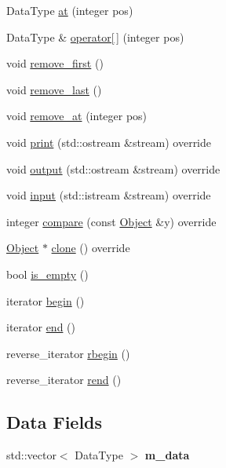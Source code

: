 \begin{DoxyCompactItemize}
\item 
Data\+Type \hyperlink{classez_1_1objects_1_1Vector_a167a5c74341831e735f10bb731fb2e6f}{at} (integer pos)
\item 
Data\+Type \& \hyperlink{classez_1_1objects_1_1Vector_aee5011651f4f13353fd0b8906467b6e3}{operator\mbox{[}$\,$\mbox{]}} (integer pos)
\item 
void \hyperlink{classez_1_1objects_1_1Vector_a6758995f2b561c6e078368fa85a8e552}{remove\+\_\+first} ()
\item 
void \hyperlink{classez_1_1objects_1_1Vector_a76e84ee9ab9024011adb4ac57571c27a}{remove\+\_\+last} ()
\item 
void \hyperlink{classez_1_1objects_1_1Vector_ad0c0f45ce57d1c99650d0a7bf0b9c2bd}{remove\+\_\+at} (integer pos)
\item 
void \hyperlink{classez_1_1objects_1_1Vector_a1c548586b93d57a8fa99e38167442f37}{print} (std\+::ostream \&stream) override
\item 
void \hyperlink{classez_1_1objects_1_1Vector_a934bda76e5686f1af4a45dda39d75744}{output} (std\+::ostream \&stream) override
\item 
void \hyperlink{classez_1_1objects_1_1Vector_af89b5f0546a049c7ade93d48eb84fa6b}{input} (std\+::istream \&stream) override
\item 
integer \hyperlink{classez_1_1objects_1_1Vector_af4bd9b005b03d1a9e5ec958d96cc24ee}{compare} (const \hyperlink{classez_1_1objects_1_1Object}{Object} \&y) override
\item 
\hyperlink{classez_1_1objects_1_1Object}{Object} $\ast$ \hyperlink{classez_1_1objects_1_1Vector_adc6a4145747c6dfa104cd68d3ced3d35}{clone} () override
\item 
bool \hyperlink{classez_1_1objects_1_1Vector_a9fc4334b5da19dc41382f25b18c6e4bc}{is\+\_\+empty} ()
\item 
iterator \hyperlink{classez_1_1objects_1_1Vector_a93276f2c67cc9acf95a9a571b574dcd7}{begin} ()
\item 
iterator \hyperlink{classez_1_1objects_1_1Vector_ab427cb054be9433127b77a98f5dd581f}{end} ()
\item 
reverse\+\_\+iterator \hyperlink{classez_1_1objects_1_1Vector_a7688a52e5860bc4df8b13aa234731c97}{rbegin} ()
\item 
reverse\+\_\+iterator \hyperlink{classez_1_1objects_1_1Vector_a1b39e82a877657e283dd4700597bfff5}{rend} ()
\end{DoxyCompactItemize}
\subsection*{Data Fields}
\begin{DoxyCompactItemize}
\item 
\mbox{\label{classez_1_1objects_1_1Vector_ab087a472289298fe52af4e1b9df79800}} 
std\+::vector$<$ Data\+Type $>$ {\bfseries m\+\_\+data}
\end{DoxyCompactItemize}
